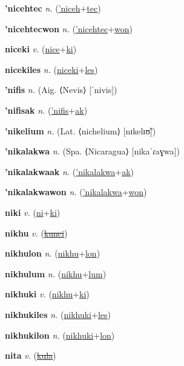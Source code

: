 \textbf{\hypertarget{'nicehtec}{'nicehtec}} \textit{n.} (\hyperlink{'niceh}{'niceh}+\allowbreak \hyperlink{tec}{tec})


\textbf{\hypertarget{'nicehtecwon}{'nicehtecwon}} \textit{n.} (\hyperlink{'nicehtec}{'nicehtec}+\allowbreak \hyperlink{won}{won})


\textbf{\hypertarget{niceki}{niceki}} \textit{v.} (\hyperlink{nice}{nice}+\allowbreak \hyperlink{ki}{ki})


\textbf{\hypertarget{nicekiles}{nicekiles}} \textit{n.} (\hyperlink{niceki}{niceki}+\allowbreak \hyperlink{les}{les})


\textbf{\hypertarget{'nifis}{'nifis}} \textit{n.} (Aig. ⟨Nevis⟩ [ˈnivis])


\textbf{\hypertarget{'nifisak}{'nifisak}} \textit{n.} (\hyperlink{'nifis}{'nifis}+\allowbreak \hyperlink{ak}{ak})


\textbf{\hypertarget{'nikelium}{'nikelium}} \textit{n.} (Lat. ⟨nichelium⟩ [nɪkelɪʊ̃])


\textbf{\hypertarget{'nikalakwa}{'nikalakwa}} \textit{n.} (Spa. ⟨Nicaragua⟩ [nikaˈɾaɣwa])


\textbf{\hypertarget{'nikalakwaak}{'nikalakwaak}} \textit{n.} (\hyperlink{'nikalakwa}{'nikalakwa}+\allowbreak \hyperlink{ak}{ak})


\textbf{\hypertarget{'nikalakwawon}{'nikalakwawon}} \textit{n.} (\hyperlink{'nikalakwa}{'nikalakwa}+\allowbreak \hyperlink{won}{won})


\textbf{\hypertarget{niki}{niki}} \textit{v.} (\hyperlink{ni}{ni}+\allowbreak \hyperlink{ki}{ki})


\textbf{\hypertarget{nikhu}{nikhu}} \textit{v.} (\hyperlink{kunci}{\sout{kunci}})


\textbf{\hypertarget{nikhulon}{nikhulon}} \textit{n.} (\hyperlink{nikhu}{nikhu}+\allowbreak \hyperlink{lon}{lon})


\textbf{\hypertarget{nikhulum}{nikhulum}} \textit{n.} (\hyperlink{nikhu}{nikhu}+\allowbreak \hyperlink{lum}{lum})


\textbf{\hypertarget{nikhuki}{nikhuki}} \textit{v.} (\hyperlink{nikhu}{nikhu}+\allowbreak \hyperlink{ki}{ki})


\textbf{\hypertarget{nikhukiles}{nikhukiles}} \textit{n.} (\hyperlink{nikhuki}{nikhuki}+\allowbreak \hyperlink{les}{les})


\textbf{\hypertarget{nikhukilon}{nikhukilon}} \textit{n.} (\hyperlink{nikhuki}{nikhuki}+\allowbreak \hyperlink{lon}{lon})


\textbf{\hypertarget{nita}{nita}} \textit{v.} (\hyperlink{kula}{\sout{kula}})


